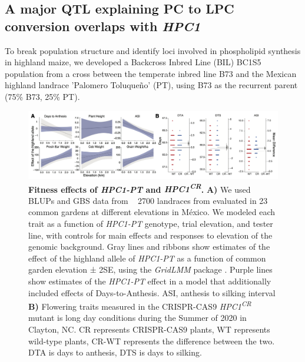 \documentclass[9pt,twocolumn,twoside,lineno]{BioRxiv}
\begin{document}
\subsection{A major QTL explaining PC to LPC conversion overlaps with \textit{HPC1}} 
To break population structure and identify loci involved in phospholipid synthesis in highland maize, we developed a Backcross Inbred Line (BIL) BC1S5 population from a cross between the temperate inbred line B73 and the Mexican highland landrace 'Palomero Toluqueño' (PT), using B73 as the recurrent parent (75\% B73, 25\% PT). 
\begin{figure}[!ht]
\begin{center}
\includegraphics[width=0.8\paperwidth]{Figures/Fig_4.png}
\caption{\textbf{Fitness effects of \textit{HPC1-PT} and \textit{HPC1\textsuperscript{CR}}.} 
\textbf{A)} We used BLUPs and GBS data from ~ 2700 landraces from \cite{Gates2019-xu} evaluated in 23 common gardens at different elevations in México. 
We modeled each trait as a function of \textit{HPC1-PT} genotype, trial elevation, and tester line, with controls for main effects and responses to elevation of the genomic background. 
Gray lines and ribbons show estimates of the effect of the highland allele of \textit{HPC1-PT} as a function of common garden elevation ± 2SE, using the \textit{GridLMM} package \cite{Runcie2019-Gr}. 
Purple lines show estimates of the \textit{HPC1-PT} effect in a model that additionally included effects of Days-to-Anthesis. ASI, anthesis to silking interval
\textbf{B)} Flowering traits measured in the CRISPR-CAS9 \textit{HPC1\textsuperscript{CR}} mutant is long day conditions during the Summer of 2020 in Clayton, NC. 
CR represents CRISPR-CAS9 plants, WT represents wild-type plants, CR-WT represents the difference between the two. DTA is days to anthesis, DTS is days to silking.} 
\label{Fig4}
\end{center}
\end{figure}
\end{document}
